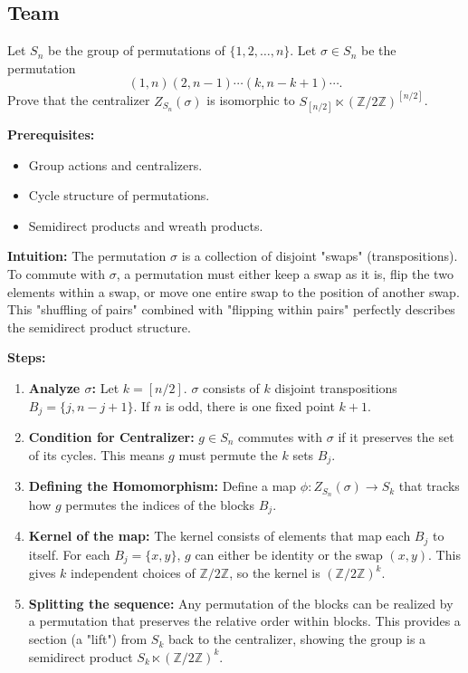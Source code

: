 \subsection*{Team}
\begin{exercise}
\label{algebra:2019:6}
Let $S_n$ be the group of permutations of $\{1, 2, \ldots, n\}$. Let $\sigma \in S_n$ be the permutation
\[(1, n)(2, n-1)\cdots(k, n-k+1)\cdots.\]
Prove that the centralizer $Z_{S_n}(\sigma)$ is isomorphic to $S_{[n/2]} \ltimes (\mathbb{Z}/2\mathbb{Z})^{[n/2]}$.
\end{exercise}

\begin{solution}
\textbf{Prerequisites:}
\begin{itemize}
    \item Group actions and centralizers.
    \item Cycle structure of permutations.
    \item Semidirect products and wreath products.
\end{itemize}

\textbf{Intuition:}
The permutation $\sigma$ is a collection of disjoint "swaps" (transpositions). To commute with $\sigma$, a permutation must either keep a swap as it is, flip the two elements within a swap, or move one entire swap to the position of another swap. This "shuffling of pairs" combined with "flipping within pairs" perfectly describes the semidirect product structure.

\par

\textbf{Steps:}
\begin{enumerate}
    \item \textbf{Analyze $\sigma$:} Let $k = [n/2]$. $\sigma$ consists of $k$ disjoint transpositions $B_j = \{j, n-j+1\}$. If $n$ is odd, there is one fixed point $k+1$.

    \item \textbf{Condition for Centralizer:} $g \in S_n$ commutes with $\sigma$ if it preserves the set of its cycles. This means $g$ must permute the $k$ sets $B_j$.

    \item \textbf{Defining the Homomorphism:} Define a map $\phi: Z_{S_n}(\sigma) \to S_k$ that tracks how $g$ permutes the indices of the blocks $B_j$.

    \item \textbf{Kernel of the map:} The kernel consists of elements that map each $B_j$ to itself. For each $B_j = \{x, y\}$, $g$ can either be identity or the swap $(x, y)$. This gives $k$ independent choices of $\mathbb{Z}/2\mathbb{Z}$, so the kernel is $(\mathbb{Z}/2\mathbb{Z})^k$.

    \item \textbf{Splitting the sequence:} Any permutation of the blocks can be realized by a permutation that preserves the relative order within blocks. This provides a section (a "lift") from $S_k$ back to the centralizer, showing the group is a semidirect product $S_k \ltimes (\mathbb{Z}/2\mathbb{Z})^k$.
\end{enumerate}
\end{solution}

